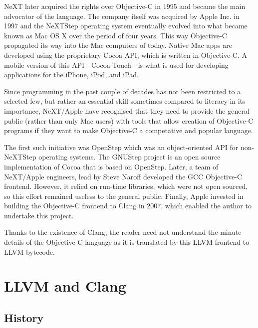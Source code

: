 \documentclass[parskip]{cs4rep}
\begin{document}
NeXT later acquired the rights over Objective-C in 1995 and became the main advocator of the language. The company itself was acquired by Apple Inc. in 1997 and the NeXTStep operating system eventually evolved into what became known as Mac OS X over the period of four years. This way Objective-C propagated its way into the Mac computers of today. Native Mac apps are developed using the proprietary Cocoa API, which is written in Objective-C. A mobile version of this API - Cocoa Touch - is what is used for developing applications for the iPhone, iPod, and iPad.

Since programming in the past couple of decades has not been restricted to a selected few, but rather an essential skill sometimes compared to literacy in its importance, NeXT/Apple have recognised that they need to provide the general public (rather than only Mac users) with tools that allow creation of Objective-C programs if they want to make Objective-C a competative and popular language.

The first such initiative was OpenStep which was an object-oriented API for non-NeXTStep operating systems. The GNUStep project is an open source implementation of Cocoa that is based on OpenStep. Later, a team of NeXT/Apple engineers, lead by Steve Naroff developed the GCC Objective-C frontend. However, it relied on run-time libraries, which were not open sourced, so this effort remained useless to the general public. Finally, Apple invested in building the Objective-C frontend to Clang in 2007, which enabled the author to undertake this project.

Thanks to the existence of Clang, the reader need not understand the minute details of the Objective-C language as it is translated by this LLVM frontend to LLVM bytecode.

\section{LLVM and Clang}

\subsection{History}
\end{document}
